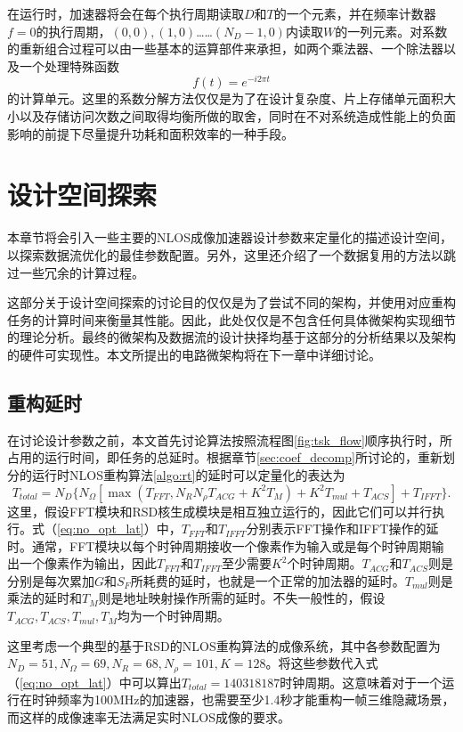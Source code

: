 \documentclass[master]{shtthesis}             %
\begin{document}
在运行时，加速器将会在每个执行周期读取$D$和$T$的一个元素，并在频率计数器$f=0$的执行周期，$(0,0),(1,0)$……$(N_D-1,0)$内读取$W$的一列元素。对系数的重新组合过程可以由一些基本的运算部件来承担，如两个乘法器、一个除法器以及一个处理特殊函数
\begin{equation}
    f(t) = e^{-i2\pi t}
\end{equation}
的计算单元。这里的系数分解方法仅仅是为了在设计复杂度、片上存储单元面积大小以及存储访问次数之间取得均衡所做的取舍，同时在不对系统造成性能上的负面影响的前提下尽量提升功耗和面积效率的一种手段。

\section{设计空间探索}\label{sec:dse}

本章节将会引入一些主要的NLOS成像加速器设计参数来定量化的描述设计空间，以探索数据流优化的最佳参数配置。另外，这里还介绍了一个数据复用的方法以跳过一些冗余的计算过程。

这部分关于设计空间探索的讨论目的仅仅是为了尝试不同的架构，并使用对应重构任务的计算时间来衡量其性能。因此，此处仅仅是不包含任何具体微架构实现细节的理论分析。最终的微架构及数据流的设计抉择均基于这部分的分析结果以及架构的硬件可实现性。本文所提出的电路微架构将在下一章中详细讨论。

\subsection{重构延时}

在讨论设计参数之前，本文首先讨论算法按照流程图\ref{fig:tsk_flow}顺序执行时，所占用的运行时间，即任务的总延时。根据章节\ref{sec:coef_decomp}所讨论的，重新划分的运行时NLOS重构算法\ref{algo:rt}的延时可以定量化的表达为
\begin{equation} \label{eq:no_opt_lat}
    T_{total} = N_D \{ N_{\Omega}[ \max (T_{FFT}, N_RN_{\rho}T_{ACG}+K^2T_M)+ K^2T_{mul}+T_{ACS} ] + T_{IFFT}\}.
\end{equation}
这里，假设FFT模块和RSD核生成模块是相互独立运行的，因此它们可以并行执行。式（\ref{eq:no_opt_lat}）中，$T_{FFT}$和$T_{IFFT}$分别表示FFT操作和IFFT操作的延时。通常，FFT模块以每个时钟周期接收一个像素作为输入或是每个时钟周期输出一个像素作为输出，因此$T_{FFT}$和$T_{IFFT}$至少需要$K^2$个时钟周期。$T_{ACG}$和$T_{ACS}$则是分别是每次累加$G$和$S_F$所耗费的延时，也就是一个正常的加法器的延时。$T_{mul}$则是乘法的延时和$T_M$则是地址映射操作所需的延时。不失一般性的，假设$T_{ACG},T_{ACS},T_{mul},T_M$均为一个时钟周期。

这里考虑一个典型的基于RSD的NLOS重构算法的成像系统\citep{Liu2020}，其中各参数配置为$N_D=51, N_\Omega=69, N_R=68, N_\rho=101, K=128$。将这些参数代入式（\ref{eq:no_opt_lat}）中可以算出$T_{total}=140318187$时钟周期。这意味着对于一个运行在时钟频率为100MHz的加速器，也需要至少1.4秒才能重构一帧三维隐藏场景，而这样的成像速率无法满足实时NLOS成像的要求。
\end{document}

